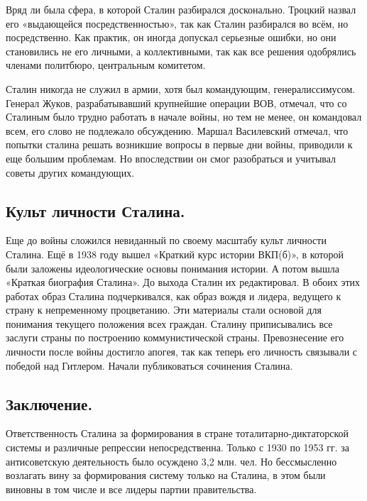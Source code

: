 Вряд ли была сфера, в которой Сталин разбирался досконально. Троцкий назвал его «выдающейся посредственностью», так как Сталин разбирался во всём, но посредственно. Как практик, он иногда допускал серьезные ошибки, но они становились не его личными, а коллективными, так как все решения одобрялись членами политбюро, центральным комитетом.

Сталин никогда не служил в армии, хотя был командующим, генералиссимусом. Генерал Жуков, разрабатывавший крупнейшие операции ВОВ, отмечал, что со Сталиным было трудно работать в начале войны, но тем не менее, он командовал всем, его слово не подлежало обсуждению. Маршал Василевский отмечал, что попытки сталина решать возникшие вопросы в первые дни войны, приводили к еще большим проблемам. Но впоследствии он смог разобраться и учитывал советы других командующих.

\subsection{Культ личности Сталина.}

Еще до войны сложился невиданный по своему масштабу культ личности Сталина. Ещё в 1938 году вышел «Краткий курс истории ВКП(б)», в которой были заложены идеологические основы понимания истории. А потом вышла «Краткая биография Сталина». До выхода Сталин их редактировал. В обоих этих работах образ Сталина подчеркивался, как образ вождя и лидера, ведущего к страну к непременному процветанию. Эти материалы стали основой для понимания текущего положения всех граждан. Сталину приписывались все заслуги страны по построению коммунистической страны. Превознесение его личности после войны достигло апогея, так как теперь его личность связывали с победой над Гитлером. Начали публиковаться сочинения Сталина.

\subsection{Заключение.}

Ответственность Сталина за формирования в стране тоталитарно-диктаторской системы и различные репрессии непосредственна. Только с 1930 по 1953 гг. за антисоветскую деятельность было осуждено 3,2 млн. чел. Но бессмысленно возлагать вину за формирования систему только на Сталина, в этом были виновны в том числе и все лидеры партии правительства.